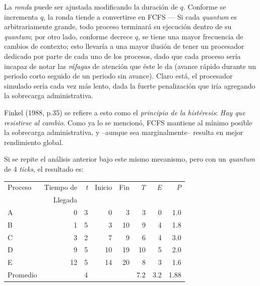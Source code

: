 \documentclass[11pt,fleqn]{book} %
\begin{document}
La \emph{ronda} puede ser ajustada modificando la duración de
$q$. Conforme se incrementa $q$, la ronda tiende a convertirse en
FCFS — Si cada \emph{quantum} es arbitrariamente grande, todo proceso
terminará su ejecución dentro de su \emph{quantum}; por otro lado,
conforme decrece $q$, se tiene una mayor frecuencia de cambios de
contexto; esto llevaría a una mayor ilusión de tener un procesador
dedicado por parte de cada uno de los procesos, dado que cada proceso
sería incapaz de notar las \emph{ráfagas} de atención que éste le da
(avance rápido durante un periodo corto seguido de un periodo sin
avance). Claro está, el procesador simulado sería cada vez más lento,
dada la fuerte penalización que iría agregando la sobrecarga
administrativa.

Finkel (1988, p.35) se refiere a esto como el \emph{principio de la histéresis}: \emph{Hay que resistirse al cambio}. Como ya lo se mencionó,
FCFS mantiene al mínimo posible la sobrecarga administrativa, y
–aunque sea marginalmente– resulta en mejor rendimiento global.

Si se repite el análisis anterior bajo este mismo mecanismo, pero con
un \emph{quantum} de 4 \emph{ticks}, el resultado es:


\begin{center}
\begin{tabular}{lrrrrrrr}
 Proceso   &  Tiempo de  &  \emph{t}  &  Inicio  &  Fin  &  \emph{T}  &  \emph{E}  &  \emph{P}  \\
           &    Llegada  &            &          &       &            &            &            \\
\hline
 A         &          0  &         3  &       0  &    3  &         3  &         0  &       1.0  \\
 B         &          1  &         5  &       3  &   10  &         9  &         4  &       1.8  \\
 C         &          3  &         2  &       7  &    9  &         6  &         4  &       3.0  \\
 D         &          9  &         5  &      10  &   19  &        10  &         5  &       2.0  \\
 E         &         12  &         5  &      14  &   20  &         8  &         3  &       1.6  \\
\hline
 Promedio  &             &         4  &          &       &       7.2  &       3.2  &      1.88  \\
\end{tabular}
\end{center}
\end{document}
